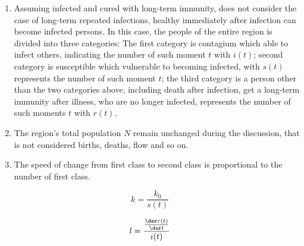 \begin{enumerate}
  \item Assuming infected and cured with long-term immunity,
   does not consider the case of long-term repeated infections,
   healthy immediately after infection can become infected
   persons. In this case, the people of the entire region is
   divided into three categories: The first category is
   contagium which able to infect others, indicating
   the number of such moment $ t $ with $ i(t) $; second
   category is susceptible which vulnerable to becoming infected, 
   with $ s(t) $ represents the number of such moment $ t $;
   the third category is a person other than the two
   categories above, including death after infection,
   get a long-term immunity after illness, who are
   no longer infected, represents the number of such
   moments $ t $ with $ r(t) $.
  \item The region's total population $N$ remain unchanged
   during the discussion, that is not considered births, deaths,
   flow and so on.
  \item The speed of change from first class to second class is
   proportional to the number of first class.
\end{enumerate}
\begin{equation}
k=\frac{k_0}{s(t)}
\label{equ:4}
\end{equation}

\begin{equation}
l=\frac{\frac{{\der}r(t)}{{\der}t}}{i(t)}
\label{equ:5}
\end{equation}

